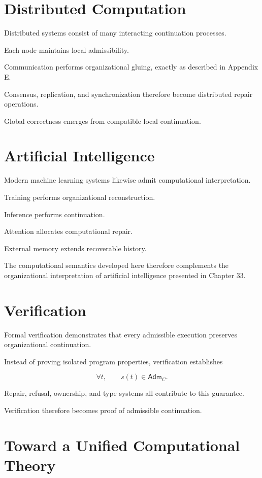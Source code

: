 \documentclass[11pt,oneside]{book}
\numberwithin{equation}{chapter}
\theoremstyle{definition}
\theoremstyle{plain}
\newcommand{\Adm}{\mathsf{Adm}}
\begin{document}
\section{Distributed Computation}

Distributed systems consist of many interacting continuation processes.

Each node maintains local admissibility.

Communication performs organizational gluing, exactly as described in
Appendix E.

Consensus, replication, and synchronization therefore become distributed
repair operations.

Global correctness emerges from compatible local continuation.

\section{Artificial Intelligence}

Modern machine learning systems likewise admit computational
interpretation.

Training performs organizational reconstruction.

Inference performs continuation.

Attention allocates computational repair.

External memory extends recoverable history.

The computational semantics developed here therefore complements the
organizational interpretation of artificial intelligence presented in
Chapter 33.

\section{Verification}

Formal verification demonstrates that every admissible execution
preserves organizational continuation.

Instead of proving isolated program properties, verification establishes

\[
\forall t,
\qquad
s(t)
\in
\Adm_C.
\]

Repair, refusal, ownership, and type systems all contribute to this
guarantee.

Verification therefore becomes proof of admissible continuation.

\section{Toward a Unified Computational Theory}
\end{document}
